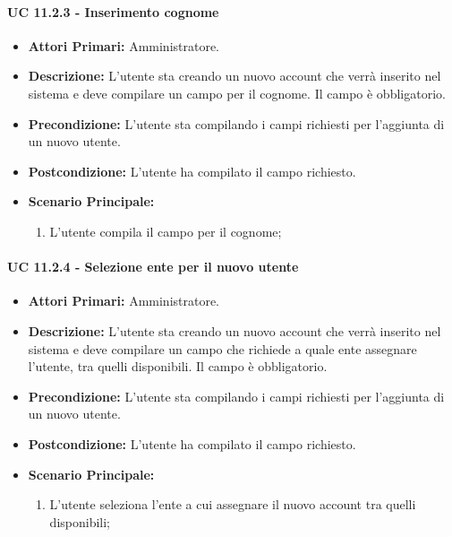 			\paragraph{UC 11.2.3 - Inserimento cognome}
			\begin{itemize}
				\item \textbf{Attori Primari:} Amministratore.
				\item \textbf{Descrizione:} L'utente sta creando un nuovo account che verrà inserito nel sistema e deve compilare un campo per il cognome. Il campo è obbligatorio.
				\item \textbf{Precondizione:} L'utente sta compilando i campi richiesti per l'aggiunta di un nuovo utente.
				\item \textbf{Postcondizione:} L'utente ha compilato il campo richiesto.
				\item \textbf{Scenario Principale:}
				\begin{enumerate}
					\item{L'utente compila il campo per il cognome;}
				\end{enumerate}	
			\end{itemize}

			\paragraph{UC 11.2.4 - Selezione ente per il nuovo utente}
			\begin{itemize}
				\item \textbf{Attori Primari:} Amministratore.
				\item \textbf{Descrizione:} L'utente sta creando un nuovo account che verrà inserito nel sistema e deve compilare un campo che richiede a quale ente assegnare l'utente, tra quelli disponibili. Il campo è obbligatorio.
				\item \textbf{Precondizione:} L'utente sta compilando i campi richiesti per l'aggiunta di un nuovo utente.
				\item \textbf{Postcondizione:} L'utente ha compilato il campo richiesto.
				\item \textbf{Scenario Principale:}
				\begin{enumerate}
					\item{L'utente seleziona l'ente a cui assegnare il nuovo account tra quelli disponibili;}
				\end{enumerate}	
			\end{itemize}

